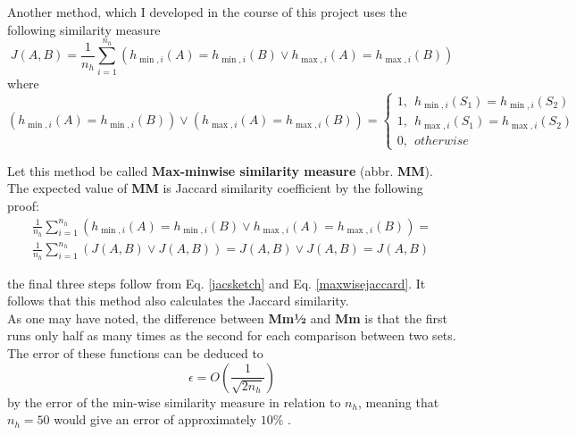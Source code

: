 \documentclass[../../main.tex]{subfiles}
\begin{document}
Another method, which I developed in the course of this project uses the following similarity measure
\begin{equation}\label{minmaxjaccard}
J(A,B)=\frac{1}{n_h}\sum_{i=1}^{n_h}(h_{\min,i}(A) = h_{\min,i}(B) \vee h_{\max,i}(A) = h_{\max,i}(B))
\end{equation}
where
$$
(h_{\min,i}(A) = h_{\min,i}(B)) \vee (h_{\max,i}(A) = h_{\max,i}(B)) = \left\{ \begin{array}{ll}
												1, \ \ h_{\min,i}(S_1)=h_{\min,i}(S_2)\\
												1, \ \ h_{\max,i}(S_1)=h_{\max,i}(S_2)\\
												0, \ \ otherwise
											  \end{array}\right.
$$

Let this method be called \textbf{Max-minwise similarity measure} (abbr. {\bf MM}). The expected value of {\bf MM} is Jaccard similarity coefficient by the following proof:\\
\begin{equation}\label{proofofMinmax}
\begin{split}
\frac{1}{n_h}\sum_{i=1}^{n_h}(h_{\min,i}(A) = h_{\min,i}(B) \vee h_{\max,i}(A) = h_{\max,i}(B)) =\\\frac{1}{n_h}\sum_{i=1}^{n_h}(J(A,B) \vee J(A,B)) = J(A,B)\vee J(A,B) = J(A,B)
\end{split}
\end{equation}

the final three steps follow from Eq. \ref{jacsketch} and Eq. \ref{maxwisejaccard}. It follows that this method also calculates the Jaccard similarity.\\

As one may have noted, the difference between \textbf{Mm½} and \textbf{Mm} is that the first runs only half as many times as the second for each comparison between two sets. The error of these functions can be deduced to
\begin{equation}\label{minmaxerror}
\epsilon = O\left(\frac{1}{\sqrt{2n_h}}\right)
\end{equation}
by the error of the min-wise similarity measure in relation to $n_h$, meaning that $n_h=50$ would give an error of approximately $ 10\%$ .
\end{document}
